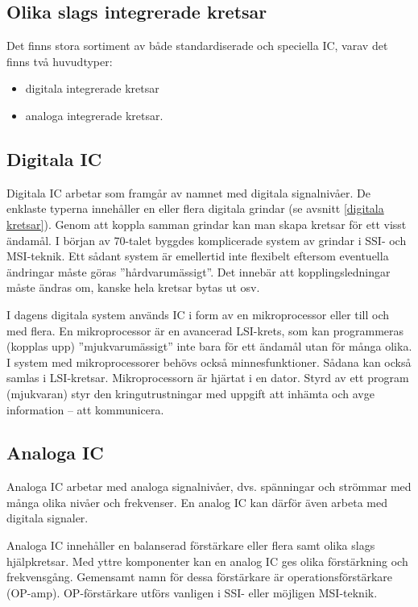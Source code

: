 \subsection{Olika slags integrerade kretsar}

Det finns stora sortiment av både standardiserade och speciella IC, varav det
finns två huvudtyper:
\begin{itemize}
  \item digitala integrerade kretsar
  \item analoga integrerade kretsar.
\end{itemize}

\subsection{Digitala IC}

Digitala IC arbetar som framgår av namnet med digitala signalnivåer. De enklaste
typerna innehåller en eller flera digitala grindar (se avsnitt
\ref{digitala kretsar}).
Genom att koppla samman grindar kan man skapa kretsar för ett visst ändamål.
I början av 70-talet byggdes komplicerade system av grindar i SSI- och
MSI-teknik.
Ett sådant system är emellertid inte flexibelt eftersom eventuella ändringar
måste göras ''hårdvarumässigt''.
Det innebär att kopplingsledningar måste ändras om, kanske hela kretsar bytas
ut osv.

I dagens digitala system används IC i form av en mikroprocessor eller till och
med flera.
En mikroprocessor är en avancerad LSI-krets, som kan programmeras
(kopplas upp) ''mjukvarumässigt'' inte bara för ett ändamål utan för många
olika. I system med mikroprocessorer behövs också minnesfunktioner. Sådana kan
också samlas i LSI-kretsar. Mikroprocessorn är hjärtat i en dator. Styrd av ett
program (mjukvaran) styr den kringutrustningar med uppgift att inhämta och avge
information -- att kommunicera.

\subsection{Analoga IC}

Analoga IC arbetar med analoga signalnivåer, dvs. spänningar och strömmar med
många olika nivåer och frekvenser. En analog IC kan därför även arbeta med
digitala signaler.

Analoga IC innehåller en balanserad förstärkare eller flera samt olika slags
hjälpkretsar. Med yttre komponenter kan en analog IC ges olika förstärkning och
frekvensgång. Gemensamt namn för dessa förstärkare är operationsförstärkare
(OP-amp). OP-förstärkare utförs vanligen i SSI- eller möjligen MSI-teknik.

